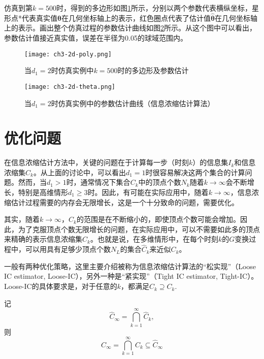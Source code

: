 仿真到第$k=500$时，得到的多边形如图\ref{fig.3.poly}所示，分别以两个参数代表横纵坐标，星形点*代表真实值$\bm{\theta}$在几何坐标轴上的表示，红色圈点代表了估计值$\hat{\bm{\theta}}$在几何坐标轴上的表示。画出整个仿真过程的参数估计曲线如图\ref{fig.3.theta.hat}所示。从这个图中可以看出，参数估计值接近真实值，误差在半径为0.05的球域范围内。
\begin{figure}[!h]
	\centering
	\texttt{[image: ch3-2d-poly.png]}\\	 %
	\caption{当$d_{1}=2$时仿真实例中$k=500$时的多边形及参数估计}
	\label{fig.3.poly}
\end{figure}

\begin{figure}[!h]
	\centering
	\texttt{[image: ch3-2d-theta.png]}\\	 %
	\caption{当$d_{1}=2$时仿真实例中的参数估计曲线（信息浓缩估计算法）}
	\label{fig.3.theta.hat}
\end{figure}

\section{优化问题}\label{sect:3.5}
在信息浓缩估计方法中，关键的问题在于计算每一步（时刻$k$）的信息集$I_{k}$和信息浓缩集$C_{k}$。从上面的讨论中，可以看出$d_{1}=1$时很容易解决这两个集合的计算问题。然而，当$d_{1}>1$时，通常情况下集合$C_{k}$中的顶点个数$N_{k}$随着$k\rightarrow\infty$会不断增长，特别是高维情形$d_{1}\geq3$时。因此，有可能在实际应用中，随着$k\rightarrow\infty$，信息浓缩估计过程需要的内存会无限增长，这是一个十分致命的问题，需要优化。

其实，随着$k\rightarrow\infty$，$C_{k}$的范围是在不断缩小的，即使顶点个数可能会增加。因此，为了克服顶点个数无限增长的问题，在实际应用中，可以不需要如此多的顶点来精确的表示信息浓缩集$C_{k}$。也就是说，在多维情形中，在每个时刻$k$的$G$变换过程中，可以用具有足够少顶点个数$N_{L}$的集合$\hat{C}_{k}$来近似$C_{k}$。

一般有两种优化策略，这里主要介绍被称为信息浓缩估计算法的“松实现”（Loose IC estimator, Loose-IC），另外一种是“紧实现”（Tight IC estimator, Tight-IC）。Loose-IC的具体要求是，对于任意的$k$，都满足$\hat{C}_k\supseteq C_k$.

记$$\hat{C}_{\infty}=\bigcap\limits_{k=1}^{\infty} \hat{C}_{k},$$
则
\begin{equation}\label{eq.loose}
C_{\infty}=\bigcap\limits_{k=1}^{\infty} C_{k}\subseteq \hat{C}_{\infty}
\end{equation}

